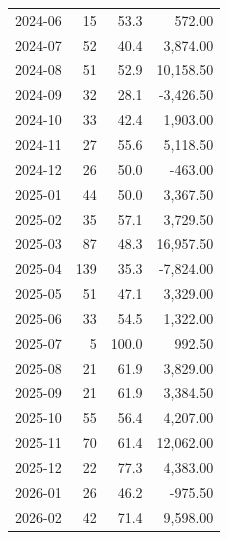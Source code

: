 \documentclass[11pt,a4paper]{article}
\begin{document}
\begin{center}
\begin{tabular}{>{\color{txtmain}}l rrr}
2024-06 & 15 & 53.3 & \textcolor{wingreen}{572.00} \\
2024-07 & 52 & 40.4 & \textcolor{wingreen}{3,874.00} \\
2024-08 & 51 & 52.9 & \textcolor{wingreen}{10,158.50} \\
2024-09 & 32 & 28.1 & \textcolor{lossred}{-3,426.50} \\
2024-10 & 33 & 42.4 & \textcolor{wingreen}{1,903.00} \\
2024-11 & 27 & 55.6 & \textcolor{wingreen}{5,118.50} \\
2024-12 & 26 & 50.0 & \textcolor{lossred}{-463.00} \\
2025-01 & 44 & 50.0 & \textcolor{wingreen}{3,367.50} \\
2025-02 & 35 & 57.1 & \textcolor{wingreen}{3,729.50} \\
2025-03 & 87 & 48.3 & \textcolor{wingreen}{16,957.50} \\
2025-04 & 139 & 35.3 & \textcolor{lossred}{-7,824.00} \\
2025-05 & 51 & 47.1 & \textcolor{wingreen}{3,329.00} \\
2025-06 & 33 & 54.5 & \textcolor{wingreen}{1,322.00} \\
2025-07 & 5 & 100.0 & \textcolor{wingreen}{992.50} \\
2025-08 & 21 & 61.9 & \textcolor{wingreen}{3,829.00} \\
2025-09 & 21 & 61.9 & \textcolor{wingreen}{3,384.50} \\
2025-10 & 55 & 56.4 & \textcolor{wingreen}{4,207.00} \\
2025-11 & 70 & 61.4 & \textcolor{wingreen}{12,062.00} \\
2025-12 & 22 & 77.3 & \textcolor{wingreen}{4,383.00} \\
2026-01 & 26 & 46.2 & \textcolor{lossred}{-975.50} \\
2026-02 & 42 & 71.4 & \textcolor{wingreen}{9,598.00} \\
\bottomrule
\end{tabular}
\end{center}
\end{document}

